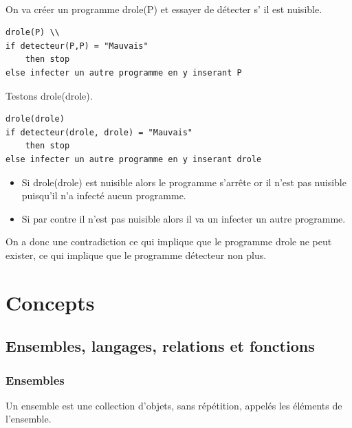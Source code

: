 \paragraph{}On va créer un programme drole(P) et essayer de détecter s’ il est nuisible.

\begin{lstlisting}
drole(P) \\
if detecteur(P,P) = "Mauvais" 
	then stop
else infecter un autre programme en y inserant P
\end{lstlisting}

Testons drole(drole).
\begin{lstlisting}
drole(drole)
if detecteur(drole, drole) = "Mauvais" 
	then stop
else infecter un autre programme en y inserant drole

\end{lstlisting}

\begin{itemize}
	\item Si drole(drole) est nuisible alors le programme s'arrête or il
	       	n'est pas nuisible puisqu'il n'a infecté aucun programme.
	\item Si par contre il n'est pas nuisible alors il va un infecter un 
		autre programme.
\end{itemize}
On a donc une contradiction ce qui implique que le programme drole ne peut 
exister, ce qui implique que  le programme détecteur non plus.


\section{Concepts}
\label{sec:concepts}


\subsection{Ensembles, langages, relations et fonctions}
\label{sub:ensembles_langages_relations_et_fonctions}

\subsubsection{Ensembles}
\label{ssub:ensembles}
Un ensemble est une collection d'objets, sans répétition, appelés les éléments
de l'ensemble.\\

